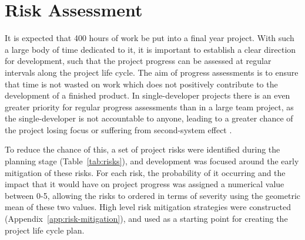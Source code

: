 \chapter{Risk Assessment}\label{chap:risks}

It is expected that 400 hours of work be put into a final year
project. With such a large body of time dedicated to it, it is
important to establish a clear direction for development, such that
the project progress can be assessed at regular intervals along the
project life cycle. The aim of progress assessments is to ensure that
time is not wasted on work which does not positively contribute to the
development of a finished product. In single-developer projects there
is an even greater priority for regular progress assessments than in a
large team project, as the single-developer is not accountable to
anyone, leading to a greater chance of the project losing focus or
suffering from second-system effect \cite{brooks1995mythical}.

To reduce the chance of this, a set of project risks were identified
during the planning stage (Table~\ref{tab:risks}), and development was
focused around the early mitigation of these risks. For each risk, the
probability of it occurring and the impact that it would have on
project progress was assigned a numerical value between 0-5, allowing
the risks to ordered in terms of severity using the geometric mean of
these two values. High level risk mitigation strategies were
constructed (Appendix~\ref{app:risk-mitigation}), and used as a
starting point for creating the project life cycle plan.




